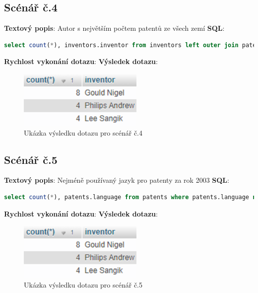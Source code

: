 \subsection{Scénář č.4}
\textbf{Textový popis}: Autor s největším počtem patentů ze všech zemí
\newline
\textbf{SQL}: 
\begin{lstlisting}[language=SQL, breaklines=true, frame=single, label = {lst:elements_a}, captionpos=b]
select count(*), inventors.inventor from inventors left outer join patents on patents.id = inventors.id_patent group by inventors.inventor order by count(*) desc LIMIT 1;
\end{lstlisting}
\textbf{Rychlost vykonání dotazu}: 
\newline
\textbf{Výsledek dotazu}:
\begin{figure}[h!]
\centering
\includegraphics[width=6cm]{img/scenare/scenar_9}
\caption{Ukázka výsledku dotazu pro scénář č.4}
\label{fig:scenar4}
\end{figure}

\subsection{Scénář č.5}
\textbf{Textový popis}: Nejméně používaný jazyk pro patenty za rok 2003
\newline
\textbf{SQL}: 
\begin{lstlisting}[language=SQL, breaklines=true, frame=single, label = {lst:elements_a}, captionpos=b]
select count(*), patents.language from patents where patents.language not like '%-%' group by patents.language order by count(*) asc LIMIT 1;
\end{lstlisting}
\textbf{Rychlost vykonání dotazu}: 
\newline
\textbf{Výsledek dotazu}:
\begin{figure}[h!]
\centering
\includegraphics[width=6cm]{img/scenare/scenar_9}
\caption{Ukázka výsledku dotazu pro scénář č.5}
\label{fig:scenar5}
\end{figure}

